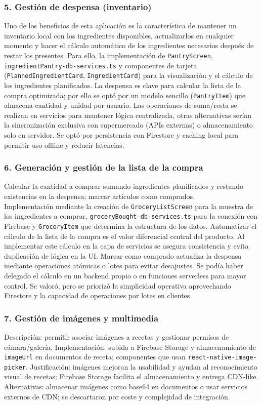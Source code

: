 \documentclass[twoside, openright, 11pt]{report}
\begin{document}
		\subsubsection{5. Gestión de despensa (inventario)}
		Uno de los beneficios de esta aplicación es la característica de mantener un inventario local con los ingredientes disponibles, actualizarlos en cualquier momento y hacer el cálculo automático de los ingredientes necesarios después de restar los presentes.
		Para ello, la implementación de \texttt{PantryScreen}, \texttt{ingredientPantry-db-services.ts} y componentes de tarjeta (\texttt{PlannedIngredientCard}, \texttt{IngredientCard}) para la visualización y el cálculo de los ingredientes planificados.  
		La despensa es clave para calcular la lista de la compra optimizada; por ello se optó por un modelo sencillo (\texttt{PantryItem}) que almacena cantidad y unidad por usuario. Las operaciones de suma/resta se realizan en servicios para mantener lógica centralizada, otras alternativas serían la sincronización exclusiva con supermercado (APIs externas) o almacenamiento solo en servidor. Se optó por persistencia con Firestore y caching local para permitir uso offline y reducir latencias.
		
		\subsubsection{6. Generación y gestión de la lista de la compra}
		Calcular la cantidad a comprar sumando ingredientes planificados y restando existencias en la despensa; marcar artículos como comprados.\\
		Implementación mediante la creación de \texttt{GroceryListScreen} para la muestra de los ingredientes a comprar, \texttt{groceryBought-db-services.ts} para la conexión con Firebase y \texttt{GroceryItem} que determina la estructura de los datos.
		Automatizar el cálculo de la lista de la compra es el valor diferencial central del producto. Al implementar este cálculo en la capa de servicios se asegura consistencia y evita duplicación de lógica en la UI. Marcar como comprado actualiza la despensa mediante operaciones atómicas o lotes para evitar desajustes.  
		Se podía haber delegado el cálculo en un backend propio o en funciones serverless para mayor control. Se valoró, pero se priorizó la simplicidad operativa aprovechando Firestore y la capacidad de operaciones por lotes en clientes.
		
		\subsubsection{7. Gestión de imágenes y multimedia}
		Descripción: permitir asociar imágenes a recetas y gestionar permisos de cámara/galería.  
		Implementación: subida a Firebase Storage y almacenamiento de \texttt{imageUrl} en documentos de receta; componentes que usan \texttt{react-native-image-picker}.  
		Justificación: imágenes mejoran la usabilidad y ayudan al reconocimiento visual de recetas; Firebase Storage facilita el almacenamiento y entrega CDN‑like.  
		Alternativas: almacenar imágenes como base64 en documentos o usar servicios externos de CDN; se descartaron por coste y complejidad de integración.
		
\end{document}
